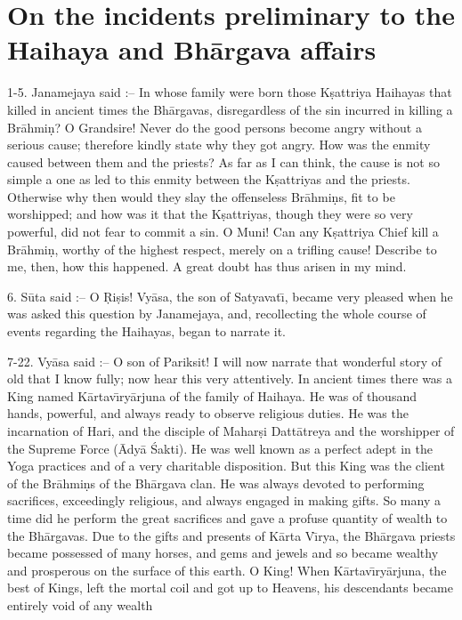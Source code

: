 \chapter{On the incidents preliminary to the Haihaya and Bh\=argava affairs}

1-5. Janamejaya said :-- In whose family were born those K\d{s}attriya Haihayas that killed in ancient times the Bh\=argavas, disregardless of the sin incurred in killing a Br\=ahmi\d{n}? O Grandsire! Never do the good persons become angry without a serious cause; therefore kindly state why they got angry. How was the enmity caused between them and the priests? As far as I can think, the cause is not so simple a one as led to this enmity between the K\d{s}attriyas and the priests. Otherwise why then would they slay the offenseless Br\=ahmi\d{n}s, fit to be worshipped; and how was it that the K\d{s}attriyas, though they were so very powerful, did not fear to commit a sin. O Muni! Can any K\d{s}attriya Chief kill a Br\=ahmi\d{n}, worthy of the highest respect, merely on a trifling cause! Describe to me, then, how this happened. A great doubt has thus arisen in my mind.

6. S\=uta said :-- O \d{R}i\d{s}is! Vy\=asa, the son of Satyavat\={\i}, became very pleased when he was asked this question by Janamejaya, and, recollecting the whole course of events regarding the Haihayas, began to narrate it.

7-22. Vy\=asa said :-- O son of Pariksit! I will now narrate that wonderful story of old that I know fully; now hear this very attentively. In ancient times there was a King named K\=artav\={\i}ry\=arjuna of the family of Haihaya. He was of thousand hands, powerful, and always ready to observe religious duties. He was the incarnation of Hari, and the disciple of Mahar\d{s}i Datt\=atreya and the worshipper of the Supreme Force (\=Ady\=a \'Sakti). He was well known as a perfect adept in the Yoga practices and of a very charitable disposition. But this King was the client of the Br\=ahmi\d{n}s of the Bh\=argava clan. He was always devoted to performing sacrifices, exceedingly religious, and always engaged in making gifts. So many a time did he perform the great sacrifices and gave a profuse quantity of wealth to the Bh\=argavas. Due to the gifts and presents of K\=arta V\={\i}rya, the Bh\=argava priests became possessed of many horses, and gems and jewels and so became wealthy and prosperous on the surface of this earth. O King! When K\=artav\={\i}ry\=arjuna, the best of Kings, left the mortal coil and got up to Heavens, his descendants became entirely void of any wealth

